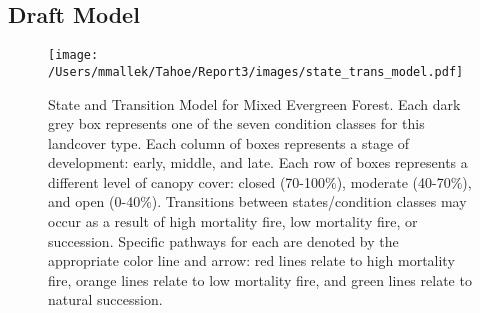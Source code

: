 \subsection*{Draft Model}
\begin{figure}[htbp]
\centering
\texttt{[image: /Users/mmallek/Tahoe/Report3/images/state\_trans\_model.pdf]}
\caption{State and Transition Model for Mixed Evergreen Forest. Each dark grey box represents one of the seven condition classes for this landcover type. Each column of boxes represents a stage of development: early, middle, and late. Each row of boxes represents a different level of canopy cover: closed (70-100\%), moderate (40-70\%), and open (0-40\%). Transitions between states/condition classes may occur as a result of high mortality fire, low mortality fire, or succession. Specific pathways for each are denoted by the appropriate color line and arrow: red lines relate to high mortality fire, orange lines relate to low mortality fire, and green lines relate to natural succession.} 
\label{meg_transmodel}
\end{figure}

\clearpage
